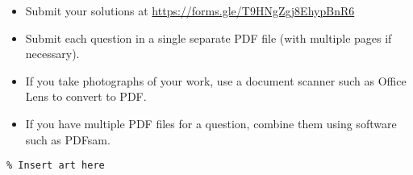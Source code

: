 \documentclass{article}
\begin{document}
\vfill
\begin{itemize}
	\item Submit your solutions at \href{https://forms.gle/T9HNgZgj8EhypBnR6}{https://forms.gle/T9HNgZgj8EhypBnR6}
	\item Submit each question in a single separate PDF file (with multiple pages if necessary).
	\item If you take photographs of your work, use a document scanner such as Office Lens to convert to PDF.
	\item If you have multiple PDF files for a question, combine them using software such as PDFsam.
\end{itemize}

\vfill
\centering
\begin{BVerbatim}
\end{BVerbatim}
\end{document}
